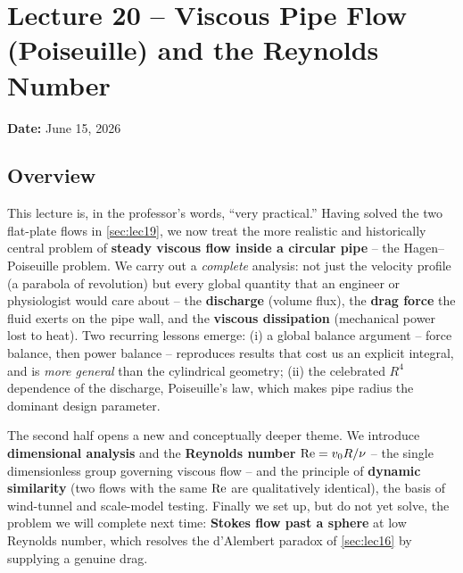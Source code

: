 \documentclass[../main.tex]{subfiles}
\begin{document}
\section{Lecture 20 -- Viscous Pipe Flow (Poiseuille) and the Reynolds Number}\label{sec:lec20}
\begin{center}
  \textbf{Date:} June 15, 2026
\end{center}

\subsection*{Overview}
This lecture is, in the professor's words, ``very practical.'' Having solved the two flat-plate flows in \cref{sec:lec19}, we now treat the more realistic and historically central problem of \textbf{steady viscous flow inside a circular pipe} -- the Hagen--Poiseuille problem. We carry out a \emph{complete} analysis: not just the velocity profile (a parabola of revolution) but every global quantity that an engineer or physiologist would care about -- the \textbf{discharge} (volume flux), the \textbf{drag force} the fluid exerts on the pipe wall, and the \textbf{viscous dissipation} (mechanical power lost to heat). Two recurring lessons emerge: (i) a global balance argument -- force balance, then power balance -- reproduces results that cost us an explicit integral, and is \emph{more general} than the cylindrical geometry; (ii) the celebrated $R^4$ dependence of the discharge, Poiseuille's law, which makes pipe radius the dominant design parameter.

The second half opens a new and conceptually deeper theme. We introduce \textbf{dimensional analysis} and the \textbf{Reynolds number} $\mathrm{Re}=v_0 R/\nu$ -- the single dimensionless group governing viscous flow -- and the principle of \textbf{dynamic similarity} (two flows with the same $\mathrm{Re}$ are qualitatively identical), the basis of wind-tunnel and scale-model testing. Finally we set up, but do not yet solve, the problem we will complete next time: \textbf{Stokes flow past a sphere} at low Reynolds number, which resolves the d'Alembert paradox of \cref{sec:lec16} by supplying a genuine drag.
\end{document}
